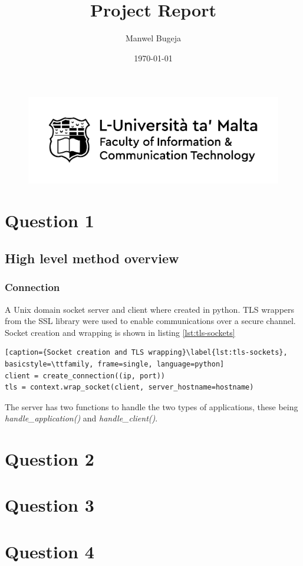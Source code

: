 \documentclass[a4paper, 12pt]{article}
\begin{document}
\begin{figure}
    \centering
    \includegraphics[width=1\textwidth]{Logo}
\end{figure}

\title{Project Report}
\author{Manwel Bugeja}
\date{\today}
\maketitle
  
\tableofcontents
\newpage


\section{Question 1}
\subsection{High level method overview}
\subsubsection{Connection}
A Unix domain socket server and client where created in python. TLS wrappers from the SSL library were used to enable communications over a secure channel. Socket creation and wrapping is shown in listing \ref{lst:tls-sockets}

\begin{lstlisting}[caption={Socket creation and TLS wrapping}\label{lst:tls-sockets}, basicstyle=\ttfamily, frame=single, language=python]
client = create_connection((ip, port))
tls = context.wrap_socket(client, server_hostname=hostname)
\end{lstlisting}

The server has two functions to handle the two types of applications, these being \textit{handle\_application()} and \textit{handle\_client()}.





\section{Question 2}
\section{Question 3}
\section{Question 4}


 
\end{document}
